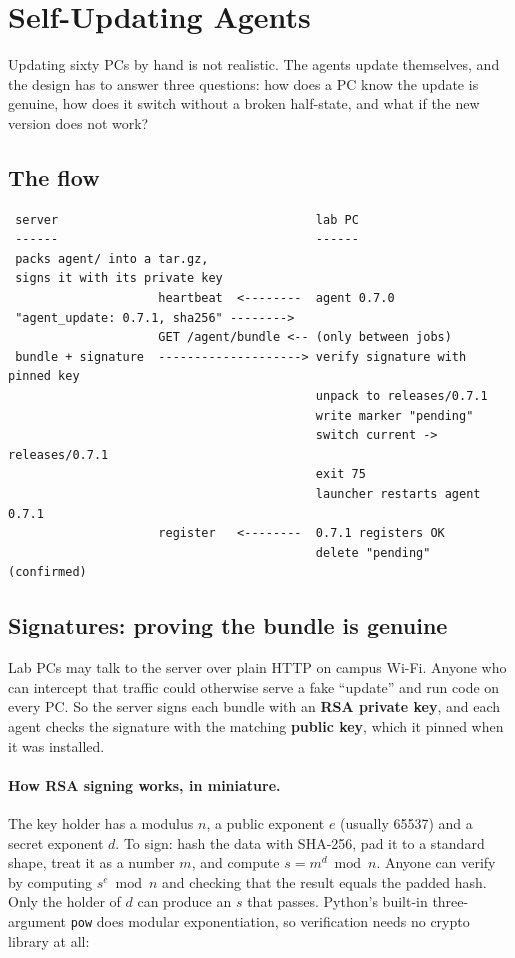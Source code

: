\section{Self-Updating Agents}

Updating sixty PCs by hand is not realistic. The agents update themselves, and
the design has to answer three questions: how does a PC know the update is
genuine, how does it switch without a broken half-state, and what if the new
version does not work?

\subsection{The flow}

\begin{verbatim}
 server                                    lab PC
 ------                                    ------
 packs agent/ into a tar.gz,
 signs it with its private key
                     heartbeat  <--------  agent 0.7.0
 "agent_update: 0.7.1, sha256" -------->
                     GET /agent/bundle <-- (only between jobs)
 bundle + signature  --------------------> verify signature with pinned key
                                           unpack to releases/0.7.1
                                           write marker "pending"
                                           switch current -> releases/0.7.1
                                           exit 75
                                           launcher restarts agent 0.7.1
                     register   <--------  0.7.1 registers OK
                                           delete "pending"  (confirmed)
\end{verbatim}

\subsection{Signatures: proving the bundle is genuine}

Lab PCs may talk to the server over plain HTTP on campus Wi-Fi. Anyone who can
intercept that traffic could otherwise serve a fake ``update'' and run code on
every PC. So the server signs each bundle with an \textbf{RSA private key}, and
each agent checks the signature with the matching \textbf{public key}, which it
pinned when it was installed.

\paragraph{How RSA signing works, in miniature.} The key holder has a modulus
$n$, a public exponent $e$ (usually 65537) and a secret exponent $d$. To sign:
hash the data with SHA-256, pad it to a standard shape, treat it as a number
$m$, and compute $s = m^d \bmod n$. Anyone can verify by computing
$s^e \bmod n$ and checking that the result equals the padded hash. Only the
holder of $d$ can produce an $s$ that passes. Python's built-in three-argument
\texttt{pow} does modular exponentiation, so verification needs no crypto
library at all:

